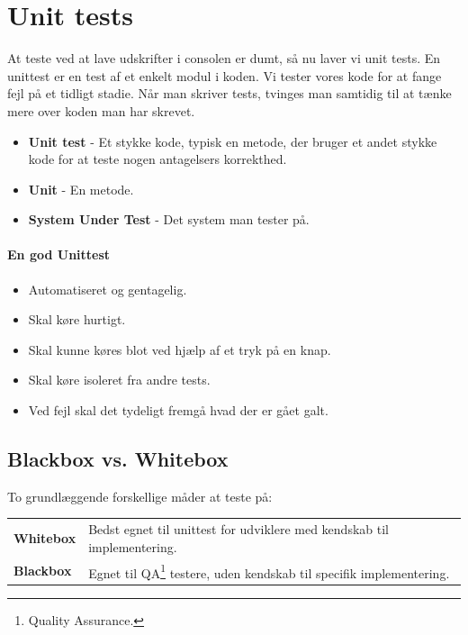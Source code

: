 \section{Unit tests}
At teste ved at lave udskrifter i consolen er dumt, så nu laver vi unit tests. En unittest er en test af et enkelt modul i koden. Vi tester vores kode for at fange fejl på et tidligt stadie. Når man skriver tests, tvinges man samtidig til at tænke mere over koden man har skrevet.

\begin{itemize}
	\item \textbf{Unit test} - Et stykke kode, typisk en metode, der bruger et andet stykke kode for at teste nogen antagelsers korrekthed.
	\item \textbf{Unit} - En metode.
	\item \textbf{System Under Test} - Det system man tester på.
\end{itemize}

\paragraph{En god Unittest}
\begin{itemize}
	\item Automatiseret og gentagelig.
	\item Skal køre hurtigt.
	\item Skal kunne køres blot ved hjælp af et tryk på en knap.
	\item Skal køre isoleret fra andre tests.
	\item Ved fejl skal det tydeligt fremgå hvad der er gået galt.
\end{itemize}

\subsection{Blackbox vs. Whitebox}
To grundlæggende forskellige måder at teste på:

\begin{table}[H]
	\begin{tabular}{ll}
		\textbf{Whitebox} & Bedst egnet til unittest for udviklere med kendskab til implementering.\\
		\textbf{Blackbox} & Egnet til QA\footnote{Quality Assurance.} testere, uden kendskab til specifik implementering.\\
	\end{tabular}
\end{table}

